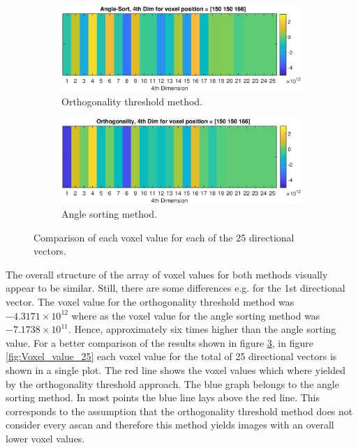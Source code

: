 \begin{figure}[H]
     \centering
     \begin{subfigure}[b]{0.85\textwidth}
         \centering
        \includegraphics[width=1.12\linewidth,right]{Graphics/Results/Diff_angle_sort_orthogonality/diff_ortho_bubble_25dim_150150150_ortho.eps}
         \caption{Orthogonality threshold method.}
         \label{fig:res:25_voxel_values_diff_bubble_ortho_image_ortho}
     \end{subfigure}
     \hfill
     \begin{subfigure}[b]{0.85\textwidth}
         \centering
         \includegraphics[width=1.12\textwidth,right]{Graphics/Results/Diff_angle_sort_orthogonality/diff_ortho_bubble_25dim_150150150_sort.eps}
         \caption{Angle sorting method.}
         \label{fig:res:25_voxel_values_diff_bubble_ortho_image_bubble}
     \end{subfigure}
        \caption{Comparison of each voxel value for each of the 25 directional vectors.}
        \label{fig:res:25_voxel_values_diff_bubble_ortho_image}
\end{figure}

The overall structure of the array of voxel values for both methods visually appear to be similar. Still, there are some differences e.g. for the 1st directional vector. The voxel value for the orthogonality threshold method was $-4.3171 \times 10^{12}$  where as the voxel value for the angle sorting method was $-7.1738\times10^{11}$. Hence, approximately six times higher than the angle sorting value. For a better comparison of the results shown in figure \ref{fig:res:25_voxel_values_diff_bubble_ortho_image}, in figure \ref{fig:Voxel_value_25} each voxel value for the total of 25 directional vectors is shown in a single plot. The red line shows the voxel values which where yielded by the orthogonality threshold approach. The blue graph belongs to the angle sorting method. In most points the blue line lays above the red line. This corresponds to the assumption that the orthogonality threshold method does not consider every \ac{ascan} and therefore this method yields images with an overall lower voxel values.


